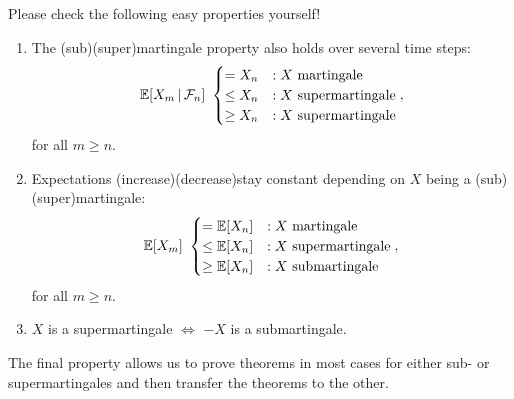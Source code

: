 Please check the following easy properties yourself!
\begin{luebung} 
	\begin{enumerate}[label=(\roman*)]
		\item The (sub)(super)martingale property also holds over several time steps:
		\begin{align*}
		 \mathbb{E}[X_m \, |\,\mathcal{F}_n]\,\,
		\begin{cases}
			=X_n&: X\text{ martingale}\\
			\leq X_n&: X\text{ supermartingale}\\
			\geq X_n&: X\text{ supermartingale}
			\end{cases},
		\end{align*}
		for all $m\geq n$.
		\item	Expectations (increase)(decrease)stay constant depending on $X$ being a (sub)(super)martingale:
		\begin{align*}
			\mathbb{E}[X_m] \,\,
			\begin{cases}
				=\mathbb{E}[X_n]&: X\text{ martingale}\\
				\leq \mathbb{E}[X_n]&:X\text{ supermartingale}\\
				\geq \mathbb{E}[X_n]&:X\text{ submartingale}\\				
			\end{cases},
		\end{align*}	
		for all $m\geq n$.
		
		\item
			$X$ is a supermartingale $\Leftrightarrow$ $-X$ is a submartingale.
	\end{enumerate}
\end{luebung}
The final property allows us to prove theorems in most cases for either sub- or supermartingales and then transfer the theorems to the other.\smallskip

